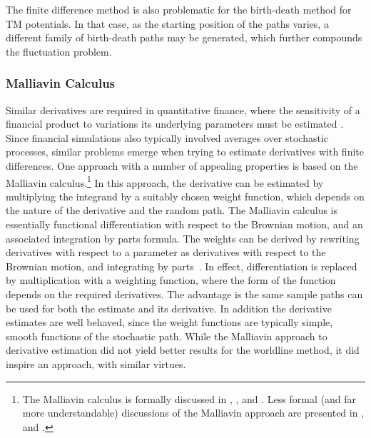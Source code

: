 The finite difference method is also problematic for the birth-death method for TM potentials.  
In that case, as the starting position of the paths varies, a different family
of birth-death paths may be generated, which further compounds the fluctuation problem.    

\subsubsection{Malliavin Calculus}
Similar derivatives are required in quantitative finance, where the sensitivity of a financial 
product to variations its underlying parameters must be estimated \citep{Glasserman2004}.  
Since financial simulations also typically involved averages over stochastic processes, similar problems emerge
when trying to estimate derivatives with finite differences.
One approach with a number of appealing properties is based on the Malliavin calculus.\footnote{
The Malliavin calculus is formally discussed in \citet{Nualart2006}, \citet{Malliavin2006}, and \cite{DiNunno2009}.
Less formal (and far more understandable) discussions of the Malliavin approach are presented in 
\citet{Chen2007}, and \citet{Kohatsu-Higa2003,Kohatsu-Higa2004}.}
In this approach, the derivative can be estimated by multiplying the integrand by
a suitably chosen weight function, which depends on the nature of the derivative and the random path.
The Malliavin calculus is essentially functional differentiation with respect to the Brownian motion, 
and an associated integration by parts formula.   
The weights can be derived by rewriting derivatives with respect to a parameter as
derivatives with respect to the Brownian motion, and integrating by parts~\citep{Kohatsu-Higa2004}.  
In effect, differentiation is replaced by multiplication with a weighting function,
 where the form of the function depends on the required derivatives.
The advantage is the same sample paths can be used for both the estimate and its derivative.  In addition
the derivative estimates are well behaved, since the weight functions are typically simple, smooth functions
of the stochastic path.   
While the Malliavin approach to derivative estimation did not yield better results for the worldline
method, it did inspire an approach, with similar virtues.   

